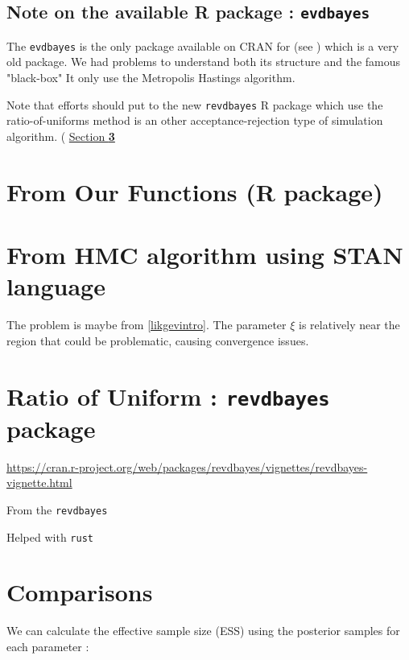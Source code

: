 \subsection*{Note on the available R package : \texttt{evdbayes}}

The \texttt{evdbayes} is the only package available on CRAN for (see \citet{ribatet_users_2006}) which is a very old package. We had problems to understand both its structure and the famous "black-box"
It only use the Metropolis Hastings algorithm.

 Note that efforts should put to the new \texttt{revdbayes} R package which use the ratio-of-uniforms method is an other acceptance-rejection type of simulation algorithm. ( \hyperref[sec:bayes_ratio]{Section \textbf{\ref{sec:bayes_ratio}}}
 
\section{From Our Functions (R package)}



\section{From HMC algorithm using STAN language}

The problem is maybe from \ref{likgevintro}. The parameter $\xi$ is relatively near the region that could be problematic, causing convergence issues. 



\section{Ratio of Uniform : \texttt{revdbayes} package}\label{sec:bayes_ratio}

\url{https://cran.r-project.org/web/packages/revdbayes/vignettes/revdbayes-vignette.html}



From the \texttt{revdbayes}

Helped with \texttt{rust}
\section{Comparisons}

\citet{hartmann_bayesian_2016}
We can calculate the effective sample size (ESS) using the posterior samples for each parameter : 

